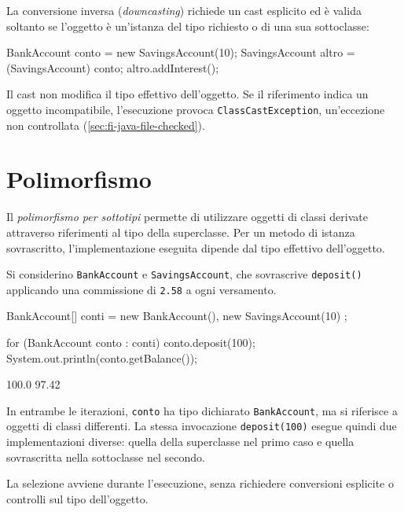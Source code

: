 La conversione inversa (\emph{downcasting}) richiede un cast
esplicito ed è valida soltanto se l'oggetto è un'istanza del tipo
richiesto o di una sua sottoclasse:

\begin{unipdcode}[language=Java]
BankAccount conto = new SavingsAccount(10);
SavingsAccount altro = (SavingsAccount) conto;
altro.addInterest();
\end{unipdcode}

Il cast non modifica il tipo effettivo dell'oggetto. Se il
riferimento indica un oggetto incompatibile, l'esecuzione
provoca \texttt{ClassCastException}, un'eccezione non controllata
(\cref{sec:fi-java-file-checked}).

\clearpage

\section{Polimorfismo}
\label{sec:fi-java-ereditarieta-polimorfismo}

\begin{definition}
\label{def:fi-java-ereditarieta-polimorfismo}
Il \emph{polimorfismo per sottotipi} permette di utilizzare
oggetti di classi derivate attraverso riferimenti al tipo della
superclasse. Per un metodo di istanza sovrascritto, l'implementazione
eseguita dipende dal tipo effettivo dell'oggetto.
\end{definition}

\begin{example}
Si considerino \texttt{BankAccount} e \texttt{SavingsAccount},
che sovrascrive \texttt{deposit()} applicando una commissione
di \texttt{2.58} a ogni versamento.

\begin{unipdcode}[language=Java]
BankAccount[] conti = {
    new BankAccount(),
    new SavingsAccount(10)
};

for (BankAccount conto : conti) {
    conto.deposit(100);
    System.out.println(conto.getBalance());
}
\end{unipdcode}

\begin{unipdterminal}
100.0
97.42
\end{unipdterminal}

In entrambe le iterazioni, \texttt{conto} ha tipo dichiarato
\texttt{BankAccount}, ma si riferisce a oggetti di classi
differenti. La stessa invocazione \texttt{deposit(100)}
esegue quindi due implementazioni diverse: quella della
superclasse nel primo caso e quella sovrascritta nella
sottoclasse nel secondo.

La selezione avviene durante l'esecuzione, senza richiedere
conversioni esplicite o controlli sul tipo dell'oggetto.
\end{example}

